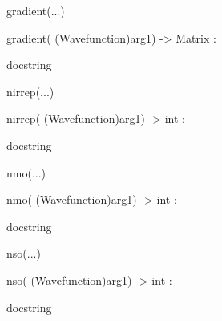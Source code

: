 \documentclass[letterpaper,10pt,english]{sphinxmanual}
\begin{document}
\begin{description}
\begin{description}
\begin{DUlineblock}{0em}
\begin{DUlineblock}{\DUlineblockindent}
\begin{DUlineblock}{\DUlineblockindent}
\end{DUlineblock}
\end{DUlineblock}
\item[] gradient(...)
\item[]
\begin{DUlineblock}{\DUlineblockindent}
\item[] gradient( (Wavefunction)arg1) -\textgreater{} Matrix :
\item[]
\begin{DUlineblock}{\DUlineblockindent}
\item[] docstring
\item[] 
\end{DUlineblock}
\end{DUlineblock}
\item[] nirrep(...)
\item[]
\begin{DUlineblock}{\DUlineblockindent}
\item[] nirrep( (Wavefunction)arg1) -\textgreater{} int :
\item[]
\begin{DUlineblock}{\DUlineblockindent}
\item[] docstring
\item[] 
\end{DUlineblock}
\end{DUlineblock}
\item[] nmo(...)
\item[]
\begin{DUlineblock}{\DUlineblockindent}
\item[] nmo( (Wavefunction)arg1) -\textgreater{} int :
\item[]
\begin{DUlineblock}{\DUlineblockindent}
\item[] docstring
\item[] 
\end{DUlineblock}
\end{DUlineblock}
\item[] nso(...)
\item[]
\begin{DUlineblock}{\DUlineblockindent}
\item[] nso( (Wavefunction)arg1) -\textgreater{} int :
\item[]
\begin{DUlineblock}{\DUlineblockindent}
\item[] docstring
\item[] 
\end{DUlineblock}

\end{DUlineblock}
\end{DUlineblock}
\end{description}
\end{description}
\end{document}
